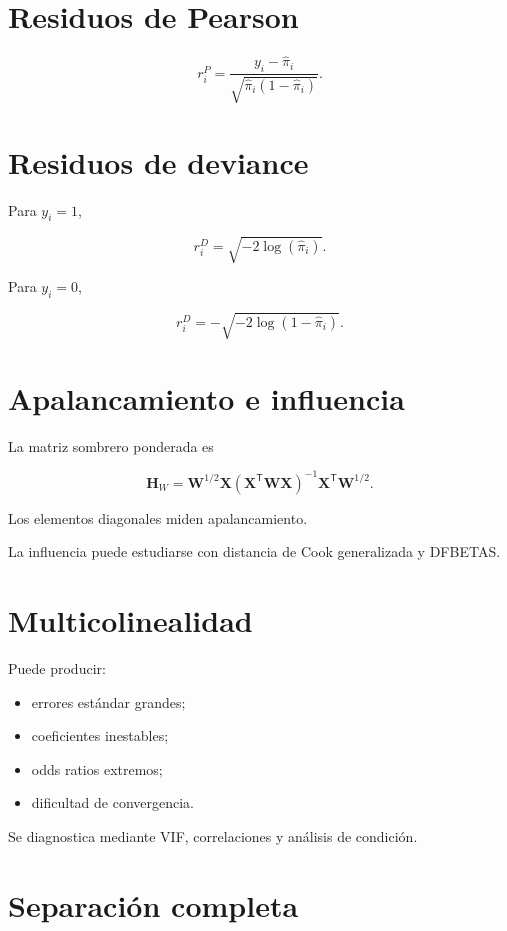 \documentclass[
  spanish,
  11pt,
  letterpaper,
  DIV=11,
  numbers=noendperiod]{scrreprt}
\providecommand{\tightlist}{%
  \setlength{\itemsep}{0pt}\setlength{\parskip}{0pt}}
\theoremstyle{definition}
\theoremstyle{plain}
\theoremstyle{definition}
\theoremstyle{remark}
\begin{document}
\section{Residuos de Pearson}\label{residuos-de-pearson}

\[
r_i^{P}
=
\frac{
y_i-\widehat{\pi}_i
}{
\sqrt{
\widehat{\pi}_i
(1-\widehat{\pi}_i)
}
}.
\]

\section{Residuos de deviance}\label{residuos-de-deviance}

Para \(y_i=1\),

\[
r_i^{D}
=
\sqrt{
-2\log(\widehat{\pi}_i)
}.
\]

Para \(y_i=0\),

\[
r_i^{D}
=
-
\sqrt{
-2\log(1-\widehat{\pi}_i)
}.
\]

\section{Apalancamiento e influencia}\label{apalancamiento-e-influencia}

La matriz sombrero ponderada es

\[
\mathbf{H}_W
=
\mathbf{W}^{1/2}
\mathbf{X}
\left(
\mathbf{X}^{\mathsf T}
\mathbf{W}
\mathbf{X}
\right)^{-1}
\mathbf{X}^{\mathsf T}
\mathbf{W}^{1/2}.
\]

Los elementos diagonales miden apalancamiento.

La influencia puede estudiarse con distancia de Cook generalizada y
DFBETAS.

\section{Multicolinealidad}\label{multicolinealidad-1}

Puede producir:

\begin{itemize}
\tightlist
\item
  errores estándar grandes;
\item
  coeficientes inestables;
\item
  odds ratios extremos;
\item
  dificultad de convergencia.
\end{itemize}

Se diagnostica mediante VIF, correlaciones y análisis de condición.

\section{Separación completa}\label{separaciuxf3n-completa}
\end{document}
